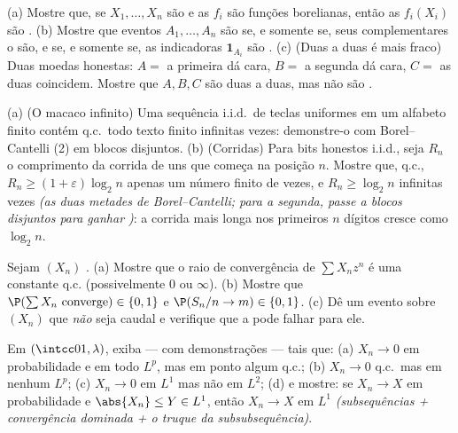 \begin{exercise}[$\star\star$]\label{exo:b3:probability:3}
(a) Mostre que, se $X_1, \dots, X_n$ são  e as $f_i$ são funções
borelianas, então as $f_i(X_i)$ são .
(b) Mostre que eventos $A_1, \dots, A_n$ são  se, e somente se, seus
complementares o são, e se, e somente se, as indicadoras $\mathbf 1_{A_i}$ são
 .
(c) (Duas a duas é mais fraco) Duas moedas honestas: $A = $ a primeira
dá cara, $B = $ a segunda dá cara, $C = $ as duas coincidem. Mostre
que $A, B, C$ são  duas a duas, mas não são .
\end{exercise}

\begin{exercise}[$\star\star$]\label{exo:b3:probability:4}
(a) (O macaco infinito) Uma sequência i.i.d.\ de teclas uniformes em um
alfabeto finito contém q.c.\ todo texto finito infinitas vezes:
demonstre-o com Borel--Cantelli (2) em blocos disjuntos.
(b) (Corridas) Para bits honestos i.i.d., seja $R_n$ o comprimento da
corrida de uns que começa na posição $n$. Mostre que, q.c., $R_n \geq (1+\varepsilon)\log_2n$
apenas um número finito de vezes, e $R_n
\geq \log_2 n$ infinitas vezes \emph{(as duas
metades de Borel--Cantelli; para a segunda, passe a blocos disjuntos
para ganhar )}: a corrida mais longa nos primeiros $n$
dígitos cresce como $\log_2n$.
\end{exercise}

\begin{exercise}[$\star\star$]\label{exo:b3:probability:5}
Sejam $(X_n)$ .
(a) Mostre que o raio de convergência de $\sum X_n z^n$ é uma constante q.c.
(possivelmente $0$ ou $\infty$).
(b) Mostre que $\P(\sum X_n \text{ converge}) \in \{0, 1\}$ e $\P(S_n/n \to m) \in \{0,1\}$.
(c) Dê um evento sobre $(X_n)$ que \emph{não} seja caudal e verifique
que a  pode falhar para ele.
\end{exercise}

\begin{exercise}[$\star\star$]\label{exo:b3:probability:6}
Em $(\intcc01, \lambda)$, exiba --- com demonstrações ---  tais que:
(a) $X_n \to 0$ em probabilidade e em todo $L^p$, mas em ponto algum q.c.;
(b) $X_n \to 0$ q.c.\ mas em nenhum $L^p$;
(c) $X_n \to 0$ em $L^1$ mas não em $L^2$;
(d) e mostre: se $X_n \to X$ em probabilidade e $\abs{X_n}
\leq Y \in L^1$, então $X_n \to X$ em $L^1$
\emph{(subsequências + convergência dominada + o truque da
subsubsequência)}.
\end{exercise}

